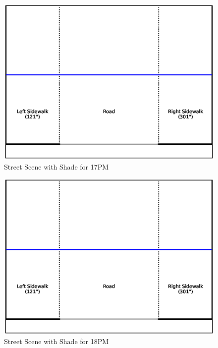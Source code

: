 \documentclass[nohyperref]{article}
\theoremstyle{plain}
\theoremstyle{definition}
\theoremstyle{remark}
\begin{document}
\begin{figure}[ht]
\begin{center}
\centerline{\includegraphics[width=\columnwidth]{sidewalk_predictions/shade_at_17}}
\caption{Street Scene with Shade for 17PM}
\end{center}
\end{figure}

\begin{figure}[ht]
\begin{center}
\centerline{\includegraphics[width=\columnwidth]{sidewalk_predictions/shade_at_18}}
\caption{Street Scene with Shade for 18PM}
\end{center}
\end{figure}
\end{document}
